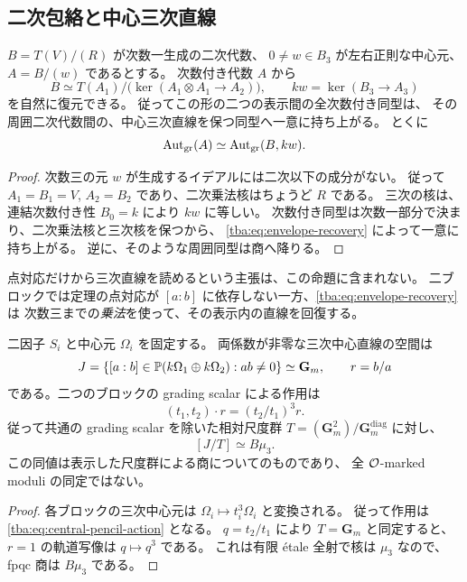 \subsection{二次包絡と中心三次直線}

\begin{proposition}[次数付き商からの二次包絡の復元]
\label{tba:prop:quadratic-envelope}
$B=T(V)/(R)$ が次数一生成の二次代数、
$0\ne w\in B_3$ が左右正則な中心元、$A=B/(w)$ であるとする。
次数付き代数 $A$ から
\begin{equation}\label{tba:eq:envelope-recovery}
 B\simeq T(A_1)/\bigl(\ker(A_1\otimes A_1\to A_2)\bigr),
 \qquad kw=\ker(B_3\to A_3)
\end{equation}
を自然に復元できる。
従ってこの形の二つの表示間の全次数付き同型は、
その周囲二次代数間の、中心三次直線を保つ同型へ一意に持ち上がる。
とくに
\[
 \operatorname{Aut}_{\mathrm{gr}}(A)
 \simeq \operatorname{Aut}_{\mathrm{gr}}(B,kw).
\]
\end{proposition}
\begin{proof}
次数三の元 $w$ が生成するイデアルには二次以下の成分がない。
従って $A_1=B_1=V$, $A_2=B_2$ であり、二次乗法核はちょうど $R$ である。
三次の核は、連結次数付き性 $B_0=k$ により $kw$ に等しい。
次数付き同型は次数一部分で決まり、二次乗法核と三次核を保つから、
\eqref{tba:eq:envelope-recovery} によって一意に持ち上がる。
逆に、そのような周囲同型は商へ降りる。
\end{proof}

点対応だけから三次直線を読めるという主張は、この命題に含まれない。
二ブロックでは定理の点対応が
$[a:b]$ に依存しない一方、\eqref{tba:eq:envelope-recovery} は
次数三までの\emph{乗法}を使って、その表示内の直線を回復する。

\begin{proposition}[中心直線の尺度商]
\label{tba:prop:central-pencil-gerbe}
二因子 $S_i$ と中心元 $\Omega_i$ を固定する。
両係数が非零な三次中心直線の空間は
\[
 J=\{[a:b]\in\mathbb P(k\Omega_1\oplus k\Omega_2):ab\ne0\}
   \simeq\mathbf G_m,
 \qquad r=b/a
\]
である。二つのブロックの grading scalar による作用は
\begin{equation}\label{tba:eq:central-pencil-action}
 (t_1,t_2)\cdot r=(t_2/t_1)^3r.
\end{equation}
従って共通の grading scalar を除いた相対尺度群
$T=(\mathbf G_m^2)/\mathbf G_m^{\mathrm{diag}}$ に対し、
\begin{equation}\label{tba:eq:pencil-gerbe}
 [J/T]\simeq B\mu_3.
\end{equation}
この同値は表示した尺度群による商についてのものであり、
全 $\mathcal O$-marked moduli の同定ではない。
\end{proposition}
\begin{proof}
各ブロックの三次中心元は $\Omega_i\mapsto t_i^3\Omega_i$ と変換される。
従って作用は \eqref{tba:eq:central-pencil-action} となる。
$q=t_2/t_1$ により $T=\mathbf G_m$ と同定すると、
$r=1$ の軌道写像は $q\mapsto q^3$ である。
これは有限 \'etale 全射で核は $\mu_3$ なので、fpqc 商は $B\mu_3$ である。
\end{proof}

